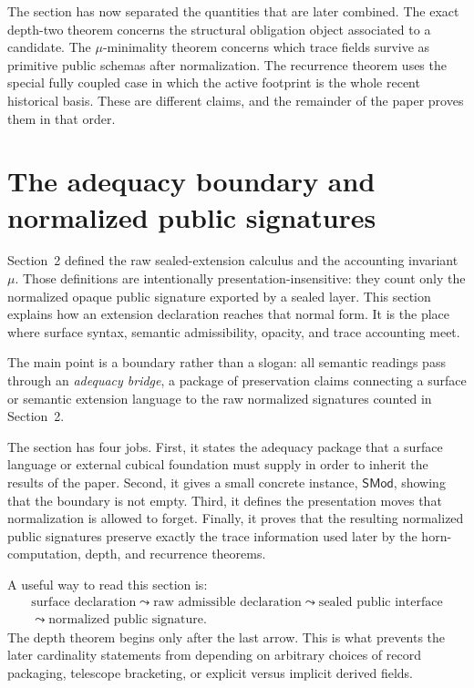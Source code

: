 \documentclass{lmcs}
\begin{document}
The section has now separated the quantities that are later combined.  The exact
depth-two theorem concerns the structural obligation object associated to a candidate.  The
\(\mu\)-minimality theorem concerns which trace fields survive as primitive public schemas
after normalization.  The recurrence theorem uses the special fully coupled case in which the
active footprint is the whole recent historical basis.  These are different claims, and the
remainder of the paper proves them in that order.

\section{The adequacy boundary and normalized public signatures}

Section~2 defined the raw sealed-extension calculus and the accounting invariant \(\mu\).
Those definitions are intentionally presentation-insensitive: they count only the normalized
opaque public signature exported by a sealed layer.  This section explains how an extension
declaration reaches that normal form.  It is the place where surface syntax, semantic
admissibility, opacity, and trace accounting meet.

The main point is a boundary rather than a slogan: all semantic readings pass through an
\emph{adequacy bridge}, a package of preservation claims connecting a surface or semantic
extension language to the raw normalized signatures counted in Section~2.

The section has four jobs.  First, it states the adequacy package that a surface language or
external cubical foundation must supply in order to inherit the results of the paper.  Second,
it gives a small concrete instance, \(\mathsf{SMod}\), showing that the boundary is not empty.
Third, it defines the presentation moves that normalization is allowed to forget.  Finally, it
proves that the resulting normalized public signatures preserve exactly the trace information
used later by the horn-computation, depth, and recurrence theorems.

A useful way to read this section is:
\[
\begin{gathered}
\text{surface declaration}
\leadsto
\text{raw admissible declaration}
\leadsto
\text{sealed public interface}\\
\leadsto
\text{normalized public signature}.
\end{gathered}
\]
The depth theorem begins only after the last arrow.  This is what prevents the later
cardinality statements from depending on arbitrary choices of record packaging, telescope
bracketing, or explicit versus implicit derived fields.
\end{document}
